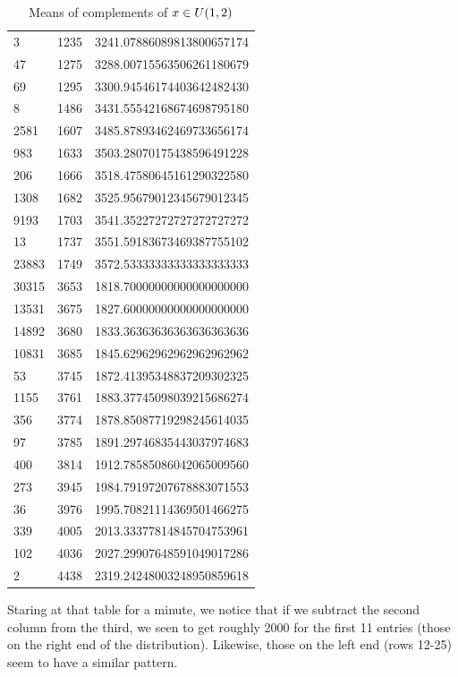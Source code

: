\documentclass{report}
\theoremstyle{remark}
\numberwithin{equation}{section}
\begin{document}
\begin{table}
\caption{Means of complements of $x \in U(1,2)$}\label{tab:mean_comps}
\centering
\begin{tabular}{lll}
3	&1235	&3241.07886089813800657174\\
47	&1275	&3288.00715563506261180679\\
69	&1295	&3300.94546174403642482430\\
8	&1486	&3431.55542168674698795180\\
2581	&1607	&3485.87893462469733656174\\
983	&1633	&3503.28070175438596491228\\
206	&1666	&3518.47580645161290322580\\
1308	&1682	&3525.95679012345679012345\\
9193	&1703	&3541.35227272727272727272\\
13	&1737	&3551.59183673469387755102\\
23883	&1749	&3572.53333333333333333333\\
30315	&3653	&1818.70000000000000000000\\
13531	&3675	&1827.60000000000000000000\\
14892	&3680	&1833.36363636363636363636\\
10831	&3685	&1845.62962962962962962962\\
53	&3745	&1872.41395348837209302325\\
1155	&3761	&1883.37745098039215686274\\
356	&3774	&1878.85087719298245614035\\
97	&3785	&1891.29746835443037974683\\
400	&3814	&1912.78585086042065009560\\
273	&3945	&1984.79197207678883071553\\
36	&3976	&1995.70821114369501466275\\
339	&4005	&2013.33377814845704753961\\
102	&4036	&2027.29907648591049017286\\
2	&4438	&2319.24248003248950859618
\end{tabular}
\end{table}

Staring at that table for a minute, we notice that if we subtract the
second column from the third, we seen to get roughly 2000 for the
first 11 entries (those on the right end of the distribution).
Likewise, those on the left end (rows 12-25) seem to have a similar
pattern.
\end{document}
